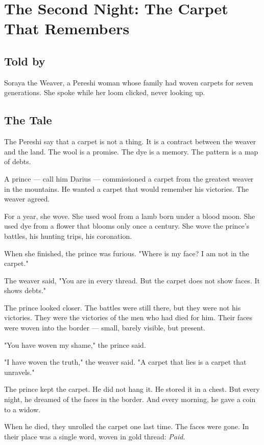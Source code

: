 \documentclass[10pt,twoside]{book}
\begin{document}
\chapter{The Second Night: The Carpet That Remembers}

\section*{Told by}
Soraya the Weaver, a Pereshi woman whose family had woven carpets for seven generations. She spoke while her loom clicked, never looking up.

\section*{The Tale}
The Pereshi say that a carpet is not a thing. It is a contract between the weaver and the land. The wool is a promise. The dye is a memory. The pattern is a map of debts.

A prince --- call him Darius --- commissioned a carpet from the greatest weaver in the mountains. He wanted a carpet that would remember his victories. The weaver agreed.

For a year, she wove. She used wool from a lamb born under a blood moon. She used dye from a flower that blooms only once a century. She wove the prince's battles, his hunting trips, his coronation.

When she finished, the prince was furious. "Where is my face? I am not in the carpet."

The weaver said, "You are in every thread. But the carpet does not show faces. It shows debts."

The prince looked closer. The battles were still there, but they were not his victories. They were the victories of the men who had died for him. Their faces were woven into the border --- small, barely visible, but present.

"You have woven my shame," the prince said.

"I have woven the truth," the weaver said. "A carpet that lies is a carpet that unravels."

The prince kept the carpet. He did not hang it. He stored it in a chest. But every night, he dreamed of the faces in the border. And every morning, he gave a coin to a widow.

When he died, they unrolled the carpet one last time. The faces were gone. In their place was a single word, woven in gold thread: \textit{Paid}.
\end{document}
